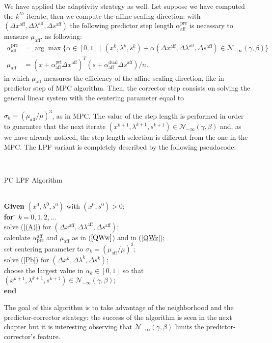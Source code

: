\documentclass[a4paper,10 pt,titlepage,twoside]{report}
\theoremstyle{plain}
\theoremstyle{definition}
\theoremstyle{remark}
\begin{document}
{{We have applied the adaptivity strategy as well. Let suppose we have computed the $k^{th}$ iterate, then we compute the affine-scaling direction: with $(\Delta x^{\text{aff}},\Delta \lambda^{\text{aff}},\Delta s^{\text{aff}})$ the following predictor step length $\alpha_{\text{aff}}^{\text{pre}}$ is necessary to measure $\mu_{\text{aff}}$, as following:
\begin{align}
\alpha_{\text{aff}}^{\text{pre}}&=\arg\max\{\alpha\in[0,1]\;|\;(x^{k}, \lambda^{k}, s^{k})+ \alpha(\Delta x^{\text{aff}}, \Delta\lambda^{\text{aff}}, \Delta s^{\text{aff}})\in\mathcal{N}_{-\infty}(\gamma,\beta)\}\label{QWw}\tag{4.19}\\
\mu_{\text{aff}}&= (x+\alpha_{\text{aff}}^{\text{pri}}\Delta x^{\text{aff}})^{T}(s+\alpha_{\text{aff}}^{\text{dual}}\Delta s^{\text{aff}})/n.\label{QWz}\tag{4.20}
\end{align}
in which $\mu_{\text{aff}}$ measures the efficiency of the affine-scaling direction, like in predictor step of MPC algorithm.
Then, the corrector step consists on solving the general linear system with the centering parameter equal to \begin{center*}
$\sigma_{k} = (\mu_{\text{aff}}/\mu)^{3}$, as in MPC. The value of the step length is performed in order to guarantee that the next iterate $(x^{k+1}, \lambda^{k+1}, s^{k+1})\in\mathcal{N}_{-\infty}(\gamma,\beta)$ and, as we have already noticed, the step length selection is different from the one in the MPC.\newpage
The LPF variant is completely described by the following pseudocode.
\end{center*}\\
\begin{algorithm}[H]\caption{\label{alg:pc}PC LPF Algorithm}
	\begin{tabbing}
		\\
		\textbf{Given} $(x^{0}, \lambda^{0}, s^{0})$ with $(x^{0}, s^{0})> 0$; \\
		\textbf{for} \= $k = 0, 1, 2,...$ \\
		\> solve (\ref{(A)}) for $(\Delta x^{\text{aff}},\Delta \lambda^{\text{aff}},\Delta s^{\text{aff}})$;\\
		\> calculate $\alpha_{\text{pre}}^{\text{aff}}$ and $\mu_{\text{aff}}$ as in ($\ref{QWw}$) and in (\ref{QWz});\\
		\> set centering parameter to $\sigma_{k} = (\mu_{\text{aff}}/\mu)^{3}$; \\
		\> solve (\ref{Pb}) for $(\Delta x^{k},\Delta \lambda^{k},\Delta s^{k})$;\\
		\> choose the largest value in $\alpha_{k}\in[0,1]$ so that $(x^{k+1}, \lambda^{k+1}, s^{k+1})\in\mathcal{N}_{-\infty}(\gamma,\beta)$;\\
		\textbf{end}
	\end{tabbing}
\end{algorithm}
The goal of this algorithm is to take advantage of the neighborhood and the predictor-corrector strategy: the success of the algorithm is seen in the next chapter but it is interesting observing that $\mathcal{N}_{-\infty}(\gamma,\beta)$ limits the predictor-corrector's feature.
\newpage
}}
\end{document}
